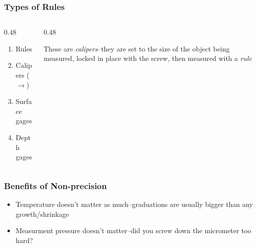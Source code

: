 \begin{frame}
	\frametitle{Types of Rules}

    \begin{columns}
        \begin{column}{0.48\linewidth}
            \begin{enumerate}[<+- | alert@+>]
                \item{Rules}
                \item{Calipers ($\rightarrow$)}
                \item{Surface gages}
                \item{Depth gages}
            \end{enumerate}   
        \end{column}
        \begin{column}{0.48\linewidth}

            \centering
            \vspace{0.25em}
            {\footnotesize These are \emph{calipers}--they are set to the size of the object being measured, locked in place with the screw, then measured with a \emph{rule}\par}
        \end{column}        
    \end{columns}
\end{frame}

\begin{frame}
	\frametitle{Benefits of Non-precision}

    \begin{itemize}[<+- | alert@+>]
        \item{Temperature doesn't matter as much--graduations are usually bigger than any growth/shrinkage}
        \item{Measurment pressure doesn't matter--did you screw down the micrometer too hard?}
    \end{itemize}        
\end{frame}

